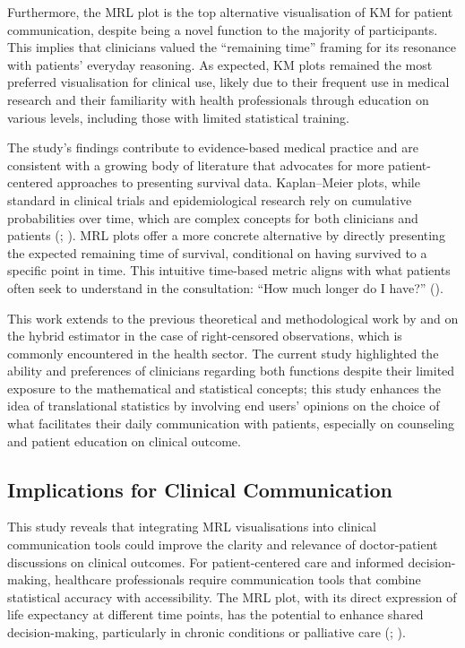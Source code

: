 \documentclass[
  onecolumn]{article}
\begin{document}
Furthermore, the MRL plot is the top alternative visualisation of KM for
patient communication, despite being a novel function to the majority of
participants. This implies that clinicians valued the ``remaining time''
framing for its resonance with patients' everyday reasoning. As
expected, KM plots remained the most preferred visualisation for
clinical use, likely due to their frequent use in medical research and
their familiarity with health professionals through education on various
levels, including those with limited statistical training.

The study's findings contribute to evidence-based medical practice and
are consistent with a growing body of literature that advocates for more
patient-centered approaches to presenting survival data. Kaplan--Meier
plots, while standard in clinical trials and epidemiological research
rely on cumulative probabilities over time, which are complex concepts
for both clinicians and patients
(\citet{collettModellingSurvivalData2023};
\citet{hawkinsCosteffectivenessAnalysisTreatments2005}). MRL plots offer
a more concrete alternative by directly presenting the expected
remaining time of survival, conditional on having survived to a specific
point in time. This intuitive time-based metric aligns with what
patients often seek to understand in the consultation: ``How much longer
do I have?'' (\citet{spiegelhalterVisualizingUncertaintyFuture2011}).

This work extends to the previous theoretical and methodological work by
\citet{alvarez-iglesiasSummarisingCensoredSurvival2015a} and
\citet{amirhosseinjalaliTranslationalStatisticsDynamic2018} on the
hybrid estimator in the case of right-censored observations, which is
commonly encountered in the health sector. The current study highlighted
the ability and preferences of clinicians regarding both functions
despite their limited exposure to the mathematical and statistical
concepts; this study enhances the idea of translational statistics by
involving end users' opinions on the choice of what facilitates their
daily communication with patients, especially on counseling and patient
education on clinical outcome.

\subsection{Implications for Clinical
Communication}\label{implications-for-clinical-communication}

This study reveals that integrating MRL visualisations into clinical
communication tools could improve the clarity and relevance of
doctor-patient discussions on clinical outcomes. For patient-centered
care and informed decision-making, healthcare professionals require
communication tools that combine statistical accuracy with
accessibility. The MRL plot, with its direct expression of life
expectancy at different time points, has the potential to enhance shared
decision-making, particularly in chronic conditions or palliative care
(\citet{belangerSharedDecisionmakingPalliative2011};
\citet{wangNonparametricSemiparametricEstimation2017}).
\end{document}
